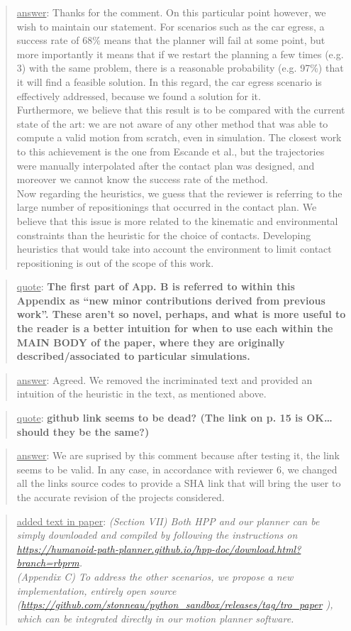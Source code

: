 \documentclass[a4paper]{article}
\newcommand{\done}[0]{}
\newcommand\quot[1]{\begin{quote} \underline{quote}: \textbf{#1}\end{quote}}
\newcommand\as[1]{\begin{quote} \underline{answer}: {#1}\end{quote} }
\newcommand\qt[1]{\begin{quote} \underline{added text in paper}: \textit{#1}\end{quote} \leavevmode \\ }
\begin{document}
\as{Thanks for the comment. On this particular point however, we wish to maintain our statement. For scenarios such as the car egress, a success rate of $68 \%$ means that the planner
will fail at some point, but more importantly it means that if we restart the planning a few times (e.g. 3) with the same problem, there is a reasonable probability (e.g. 97\%) that it will find a feasible solution.
In this regard, the car egress scenario is effectively addressed, because we found a solution for it. \\
Furthermore, we believe that this result is to be compared with the current state of the art: we are not aware of any other method that was able
to compute a valid motion from scratch, even in simulation. The closest work to this achievement is the one from Escande et al., but the trajectories were manually interpolated
after the contact plan was designed, and moreover we cannot know the success rate of the method. \\
Now regarding the heuristics, we guess that the reviewer is referring to the large number of repositionings that occurred in the contact plan. We believe that this issue
is more related to the kinematic and environmental constraints than the heuristic for the choice of contacts. Developing heuristics that would take into account the environment to limit 
contact repositioning is out of the scope of this work.}

\done

\quot{
The first part of App. B is referred to within this Appendix as “new minor contributions derived from previous work”. These aren’t so novel, perhaps, and what is more useful to the reader is a better intuition for when to use each within the MAIN BODY of the paper, where they are originally described/associated to particular simulations.
}

\as{Agreed. We removed the incriminated text and provided an intuition of the heuristic in the text, as mentioned above.}\done

\quot{github link seems to be dead? (The link on p. 15 is OK\dots should they be the same?)}

\as{We are suprised by this comment because after testing it, the link seems to be valid. In any case, in accordance with reviewer 6, we changed all the links source codes to provide a SHA link that will bring the user to the accurate revision of the projects considered.}
\qt{(Section VII) Both HPP and our planner can be simply downloaded and compiled by following the instructions on
\url{https://humanoid-path-planner.github.io/hpp-doc/download.html?branch=rbprm}. \\
(Appendix C) To address the other scenarios, we propose a new implementation, entirely open source (\url{https://github.com/stonneau/python_sandbox/releases/tag/tro_paper} ), which can be integrated directly in our motion planner software. }\done
\end{document}
